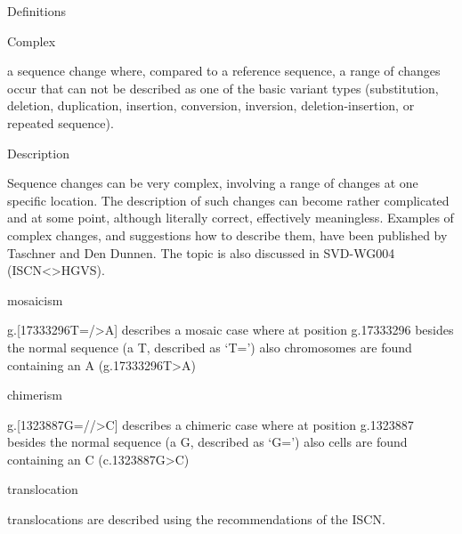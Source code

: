 \documentclass{book}
\begin{document}
	Definitions

	Complex

	a sequence change where, compared to a reference sequence, a range of changes occur that can not be described as one of the basic variant types (substitution, deletion, duplication, insertion, conversion, inversion, deletion-insertion, or repeated sequence).

	

	

	Description

	Sequence changes can be very complex, involving a range of changes at one specific location. The description of such changes can become rather complicated and at some point, although literally correct, effectively meaningless. Examples of complex changes, and suggestions how to describe them, have been published by Taschner and Den Dunnen. The topic is also discussed in SVD-WG004 (ISCN<>HGVS).

	mosaicism

	g.[17333296T=/>A] describes a mosaic case where at position g.17333296 besides the normal sequence (a T, described as ‘T=’) also chromosomes are found containing an A (g.17333296T>A)

	chimerism

	g.[1323887G=//>C] describes a chimeric case where at position g.1323887 besides the normal sequence (a G, described as ‘G=’) also cells are found containing an C (c.1323887G>C)

	translocation

	translocations are described using the recommendations of the ISCN.

	
\end{document}
